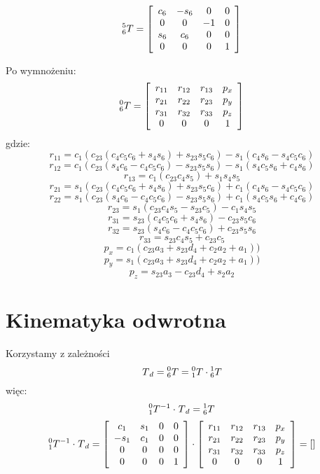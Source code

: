 \documentclass[]{article}
\begin{document}
\[\prescript{5}{6}{T}=\begin{bmatrix}
\begin{array}{cccc}
c_6 & -s_6 & 0 & 0 \\
0 & 0 & -1 & 0 \\
s_6 & c_6 & 0 & 0 \\
0 & 0 & 0 & 1 \\
\end{array}
\end{bmatrix}
\]

Po wymnożeniu:
\[\prescript{0}{6}{T}=\begin{bmatrix}
\begin{array}{cccc}
r_{11} & r_{12} & r_{13} & p_x \\
r_{21} & r_{22} & r_{23} & p_y \\
r_{31} & r_{32} & r_{33} & p_z \\
0 & 0 & 0 & 1 \\
\end{array}
\end{bmatrix}
\]
gdzie:
\[ r_{11} = c_1(c_{23}(c_4c_5c_6 + s_4s_6) + s_{23}s_5c_6) - s_1(c_4s_6 -s_4c_5c_6)\]
\[ r_{12} = c_1(c_{23}(s_4c_6 - c_4c_5c_6) - s_{23}s_5s_6) - s_1(s_4c_5s_6 + c_4s_6)\]
\[ r_{13} = c_1(c_{23}c_4s_5) + s_1s_4s_5\]
\[ r_{21} = s_1(c_{23}(c_4c_5c_6 + s_4s_6) + s_{23}s_5c_6) + c_1(c_4s_6 -s_4c_5c_6 )\]
\[ r_{22} = s_1(c_{23}(s_4c_6 - c_4c_5c_6) - s_{23}s_5s_6) + c_1(s_4c_5s_6 + c_4c_6)\]
\[ r_{23} = s_1(c_{23}c_4s_5 - s_{23}c_5) - c_1s_4s_5\]
\[ r_{31} = s_{23}(c_4c_5c_6 + s_4s_6) - c_{23}s_5c_6\]
\[ r_{32} = s_{23}(s_4c_6 - c_4c_5c_6) + c_{23}s_5s_6\]
\[ r_{33} = s_{23}c_4s_5 + c_{23}c_5\] 
\[ p_x = c_1(c_{23}a_3 + s_{23}d_4 + c_2a_2 + a_1))\] 
\[ p_y = s_1(c_{23}a_3 + s_{23}d_4 + c_2a_2 + a_1))\]
\[ p_z = s_{23}a_3 - c_{23}d_4 + s_2a_2 \]

\section{Kinematyka odwrotna}
Korzystamy z zależności
\[ \prescript{}{}{T}_d = \prescript{0}{6}{T} = \prescript{0}{1}{T} \cdot \prescript{1}{6}{T} \]
więc:
\[\prescript{0}{1}{T}^{-1} \cdot \prescript{}{}{T}_d = \prescript{1}{6}{T} \]
\[ \prescript{0}{1}{T}^{-1} \cdot \prescript{}{}{T}_d =  \begin{bmatrix}
\begin{array}{cccc}
c_1 & s_1 & 0 & 0 \\
-s_1 & c_1 & 0 & 0 \\
0 & 0 & 0 & 0 \\
0 & 0 & 0 & 1 \\
\end{array}
\end{bmatrix} \cdot  \begin{bmatrix}
\begin{array}{cccc}
r_{11} & r_{12} & r_{13} & p_x \\
r_{21} & r_{22} & r_{23} & p_y \\
r_{31} & r_{32} & r_{33} & p_z \\
0 & 0 & 0 & 1 \\
\end{array}
\end{bmatrix}  = [] \]
\end{document}
